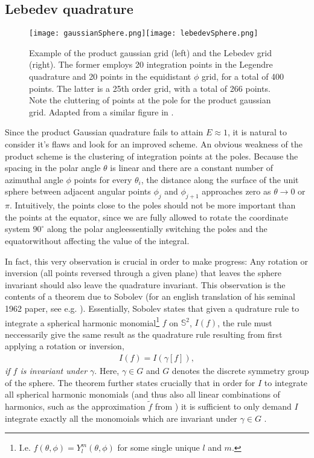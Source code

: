 \documentclass[../../master.tex]{subfiles}
\begin{document}
\subsection{Lebedev quadrature}
\begin{figure}
\centering
\texttt{[image: gaussianSphere.png]}\texttt{[image: lebedevSphere.png]}
\caption{Example of the product gaussian grid (left) and the Lebedev grid (right). The former employs 20 integration points in the Legendre quadrature and 20 points in the equidistant $\phi$ grid, for a total of 400 points. The latter is a 25th order grid, with a total of 266 points. Note the cluttering of points at the pole for the product gaussian grid. Adapted from a similar figure in \cite{beentjes}.\label{fig:dft1}}
\end{figure}
Since the product Gaussian quadrature fails to attain $E\approx1$, it is natural to consider it's flaws and look for an improved scheme. An obvious weakness of the product scheme is the clustering of integration points at the poles. Because the spacing in the polar angle $\theta$ is linear and there are a constant number of azimuthal angle $\phi$ points for every $\theta_i$, the distance along the surface of the unit sphere between adjacent angular points $\phi_j$ and $\phi_{j+1}$ approaches zero as $\theta\rightarrow0$ or $\pi$. Intuitively, the points close to the poles should not be more important than the points at the equator, since we are fully allowed to rotate the coordinate system $90^\circ$ along the polar angle\textemdash essentially switching the poles and the equator\textemdash without affecting the value of the integral.

In fact, this very observation is crucial in order to make progress: Any rotation or inversion (all points reversed through a given plane) that leaves the sphere invariant should also leave the quadrature invariant. This observation is the contents of a theorem due to Sobolev (for an english translation of his seminal 1962 paper, see e.g. \cite{sobolev}). Essentially, Sobolev states that given a qudrature rule to integrate a spherical harmonic monomial\footnote{I.e. $f(\theta,\phi)=Y^m_l(\theta,\phi)$ for some single unique $l$ and $m$.} $f$ on $\mathbb{S}^2$, $I(f)$, the rule must neccessarily give the same result as the quadrature rule resulting from first applying a rotation or inversion,
\begin{align}
I(f)=I(\gamma[f]),
\end{align}
\emph{if $f$ is invariant under $\gamma$}. Here, $\gamma\in G$ and $G$ denotes the discrete symmetry group of the sphere. The theorem further states crucially that in order for $I$ to integrate all spherical harmonic monomials (and thus also all linear combinations of harmonics, such as the approximation $\tilde f$ from ) it is sufficient to only demand $I$ integrate exactly all the monomoials which are invariant under $\gamma\in G$ \cite{atkinson}. 
\end{document}
